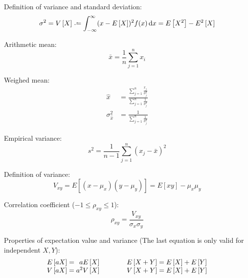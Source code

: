 			\noindent
			Definition of variance and standard deviation:
			\begin{equation}
				\sigma^2 = V\left[ X \right] \defeq \int_{-\infty}^{\infty} (x-E\left[X\right])^2f(x)\dd{x} = E\left[X^2\right]-E^2\left[X\right]
			\end{equation}

			\noindent
			Arithmetic mean:
			\begin{equation}
				\bar{x}=\frac{1}{n}\sum_{j=1}^n x_i
			\end{equation}

			\noindent
			Weighed mean:
			\begin{equation}
				\begin{aligned}
					\hat{x} &= \frac{\sum_{j=1}^n \frac{x_j}{\sigma_j^2}}{\sum_{j=1}^n \frac{1}{\sigma_j^2}} \\
					\sigma_{\hat{x}}^2 &= \frac{1}{\sum_{j=1}^n \frac{1}{\sigma_j^2}}
				\end{aligned}
			\end{equation}

			\noindent
			Empirical variance:
			\begin{equation}
				s^2 = \frac{1}{n-1}\sum_{j=1}^n (x_j-\bar{x})^2
			\end{equation}

			\noindent
			Definition of variance:
			\begin{equation}
				V_{xy} = E\left[(x-\mu_x)(y-\mu_y)\right] = E\left[xy\right]-\mu_x\mu_y
			\end{equation}

			\noindent
			Correlation coefficient ($-1\le\rho_{xy}\le 1$):
			\begin{equation}
				\rho_{xy} = \frac{V_{xy}}{\sigma_x\sigma_y}
			\end{equation}

			\noindent
			Properties of expectation value and variance (The last equation is only valid for independent $X, Y$):
			\begin{equation}
				\begin{array}{rl}
					E\left[aX\right] = \phantom{^2}a E\left[X\right]
					& \hspace{30pt}
					E\left[X+Y\right] = E\left[X\right] + E\left[Y\right]
					\\
					V\left[aX\right] = a^2 V\left[X\right]
					& \hspace{30pt}
					V\left[X+Y\right] = E\left[X\right] + E\left[Y\right]
					\\
				\end{array}
			\end{equation}

